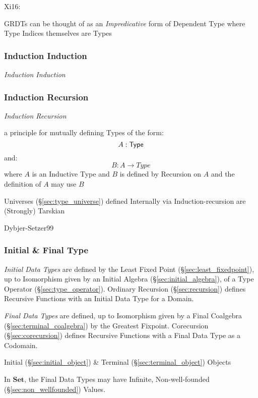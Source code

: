 Xi16:

GRDTs can be thought of as an \emph{Impredicative} form of Dependent
Type where Type Indices themselves are Types



\subsubsection{Induction Induction}\label{sec:induction_induction}

\emph{Induction Induction}



\subsubsection{Induction Recursion}\label{sec:induction_recursion}

\emph{Induction Recursion}

a principle for mutually defining Types of the form:
\[
  A : \mathsf{Type}
\]
and:
\[
  B : A \rightarrow Type
\]
where $A$ is an Inductive Type and $B$ is defined by Recursion on $A$
and the definition of $A$ may use $B$

Universes (\S\ref{sec:type_universe}) defined Internally via
Induction-recursion are (Strongly) Tarskian

Dybjer-Setzer99



\subsubsection{Initial \& Final Type}\label{sec:initial_final_type}

\emph{Initial Data Types} are defined by the Least Fixed Point
(\S\ref{sec:least_fixedpoint}), up to Isomorphism given by an Initial
Algebra (\S\ref{sec:initial_algebra}), of a Type Operator
(\S\ref{sec:type_operator}). Ordinary Recursion
(\S\ref{sec:recursion}) defines Recursive Functions with an Initial
Data Type for a Domain.

\emph{Final Data Types} are defined, up to Isomorphism given by a
Final Coalgebra (\S\ref{sec:terminal_coalgebra}) by the Greatest
Fixpoint. Corecursion (\S\ref{sec:corecursion}) defines Recursive
Functions with a Final Data Type as a Codomain.

Initial (\S\ref{sec:initial_object}) \& Terminal
(\S\ref{sec:terminal_object}) Objects

In $\mathbf{Set}$, the Final Data Types may have Infinite,
Non-well-founded (\S\ref{sec:non_wellfounded}) Values.


